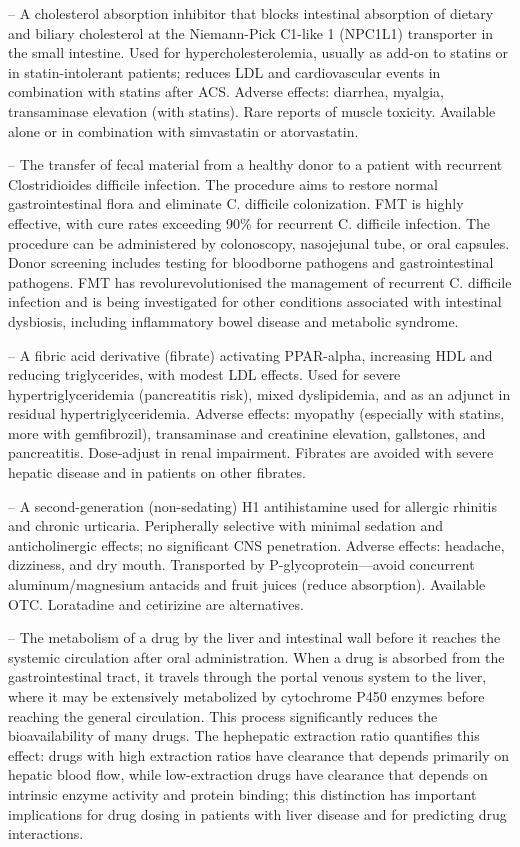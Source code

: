 -- A cholesterol absorption inhibitor that blocks intestinal absorption of dietary and biliary cholesterol at the Niemann-Pick C1-like 1 (NPC1L1) transporter in the small intestine. Used for hypercholesterolemia, usually as add-on to statins or in statin-intolerant patients; reduces LDL and cardiovascular events in combination with statins after ACS. Adverse effects: diarrhea, myalgia, transaminase elevation (with statins). Rare reports of muscle toxicity. Available alone or in combination with simvastatin or atorvastatin.

-- The transfer of fecal material from a healthy donor to a patient with recurrent Clostridioides difficile infection. The procedure aims to restore normal gastrointestinal flora and eliminate C. difficile colonization. FMT is highly effective, with cure rates exceeding 90\% for recurrent C. difficile infection. The procedure can be administered by colonoscopy, nasojejunal tube, or oral capsules. Donor screening includes testing for bloodborne pathogens and gastrointestinal pathogens. FMT has revolurevolutionised the management of recurrent C. difficile infection and is being investigated for other conditions associated with intestinal dysbiosis, including inflammatory bowel disease and metabolic syndrome.

-- A fibric acid derivative (fibrate) activating PPAR-alpha, increasing HDL and reducing triglycerides, with modest LDL effects. Used for severe hypertriglyceridemia (pancreatitis risk), mixed dyslipidemia, and as an adjunct in residual hypertriglyceridemia. Adverse effects: myopathy (especially with statins, more with gemfibrozil), transaminase and creatinine elevation, gallstones, and pancreatitis. Dose-adjust in renal impairment. Fibrates are avoided with severe hepatic disease and in patients on other fibrates.

-- A second-generation (non-sedating) H1 antihistamine used for allergic rhinitis and chronic urticaria. Peripherally selective with minimal sedation and anticholinergic effects; no significant CNS penetration. Adverse effects: headache, dizziness, and dry mouth. Transported by P-glycoprotein—avoid concurrent aluminum/magnesium antacids and fruit juices (reduce absorption). Available OTC. Loratadine and cetirizine are alternatives.

-- The metabolism of a drug by the liver and intestinal wall before it reaches the systemic circulation after oral administration. When a drug is absorbed from the gastrointestinal tract, it travels through the portal venous system to the liver, where it may be extensively metabolized by cytochrome P450 enzymes before reaching the general circulation. This process significantly reduces the bioavailability of many drugs. The hephepatic extraction ratio quantifies this effect: drugs with high extraction ratios have clearance that depends primarily on hepatic blood flow, while low-extraction drugs have clearance that depends on intrinsic enzyme activity and protein binding; this distinction has important implications for drug dosing in patients with liver disease and for predicting drug interactions.

